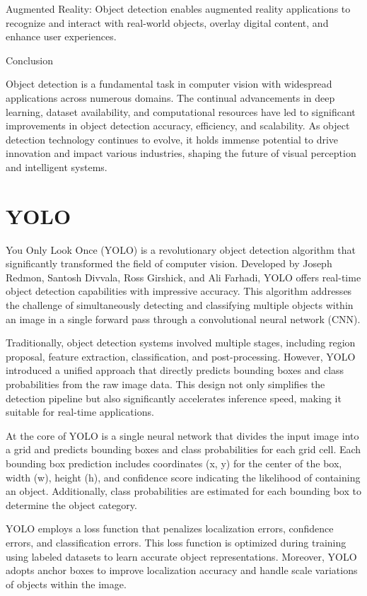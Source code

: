 Augmented Reality: Object detection enables augmented reality applications to recognize and interact with real-world objects, overlay digital content, and enhance user experiences.

Conclusion

Object detection is a fundamental task in computer vision with widespread applications across numerous domains. The continual advancements in deep learning, dataset availability, and computational resources have led to significant improvements in object detection accuracy, efficiency, and scalability. As object detection technology continues to evolve, it holds immense potential to drive innovation and impact various industries, shaping the future of visual perception and intelligent systems.






\section{YOLO}
You Only Look Once (YOLO) is a revolutionary object detection algorithm that significantly transformed the field of computer vision. Developed by Joseph Redmon, Santosh Divvala, Ross Girshick, and Ali Farhadi, YOLO offers real-time object detection capabilities with impressive accuracy. This algorithm addresses the challenge of simultaneously detecting and classifying multiple objects within an image in a single forward pass through a convolutional neural network (CNN).

Traditionally, object detection systems involved multiple stages, including region proposal, feature extraction, classification, and post-processing. However, YOLO introduced a unified approach that directly predicts bounding boxes and class probabilities from the raw image data. This design not only simplifies the detection pipeline but also significantly accelerates inference speed, making it suitable for real-time applications.

At the core of YOLO is a single neural network that divides the input image into a grid and predicts bounding boxes and class probabilities for each grid cell. Each bounding box prediction includes coordinates (x, y) for the center of the box, width (w), height (h), and confidence score indicating the likelihood of containing an object. Additionally, class probabilities are estimated for each bounding box to determine the object category.

YOLO employs a loss function that penalizes localization errors, confidence errors, and classification errors. This loss function is optimized during training using labeled datasets to learn accurate object representations. Moreover, YOLO adopts anchor boxes to improve localization accuracy and handle scale variations of objects within the image.

